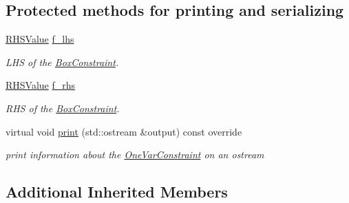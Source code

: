 \subsection*{Protected methods for printing and serializing}
\begin{DoxyCompactItemize}
\item 
\mbox{\label{class_s_m_spp__di__unipi__it_1_1_box_constraint_a4a07fa1468749fabf1ebf66e97011086}} 
\mbox{\hyperlink{class_s_m_spp__di__unipi__it_1_1_row_constraint_a8813536ab3b13a81c8e83a999ade3bd8}{R\+H\+S\+Value}} \mbox{\hyperlink{class_s_m_spp__di__unipi__it_1_1_box_constraint_a4a07fa1468749fabf1ebf66e97011086}{f\+\_\+lhs}}
\begin{DoxyCompactList}\small\item\em L\+HS of the \mbox{\hyperlink{class_s_m_spp__di__unipi__it_1_1_box_constraint}{Box\+Constraint}}. \end{DoxyCompactList}\item 
\mbox{\label{class_s_m_spp__di__unipi__it_1_1_box_constraint_ac41d0fab1f795d45c50f5f342d9d5240}} 
\mbox{\hyperlink{class_s_m_spp__di__unipi__it_1_1_row_constraint_a8813536ab3b13a81c8e83a999ade3bd8}{R\+H\+S\+Value}} \mbox{\hyperlink{class_s_m_spp__di__unipi__it_1_1_box_constraint_ac41d0fab1f795d45c50f5f342d9d5240}{f\+\_\+rhs}}
\begin{DoxyCompactList}\small\item\em R\+HS of the \mbox{\hyperlink{class_s_m_spp__di__unipi__it_1_1_box_constraint}{Box\+Constraint}}. \end{DoxyCompactList}\item 
\mbox{\label{class_s_m_spp__di__unipi__it_1_1_box_constraint_a59a9fcbf8f9f86d348344b2073644b0e}} 
virtual void \mbox{\hyperlink{class_s_m_spp__di__unipi__it_1_1_box_constraint_a59a9fcbf8f9f86d348344b2073644b0e}{print}} (std\+::ostream \&output) const override
\begin{DoxyCompactList}\small\item\em print information about the \mbox{\hyperlink{class_s_m_spp__di__unipi__it_1_1_one_var_constraint}{One\+Var\+Constraint}} on an ostream \end{DoxyCompactList}\end{DoxyCompactItemize}
\subsection*{Additional Inherited Members}


